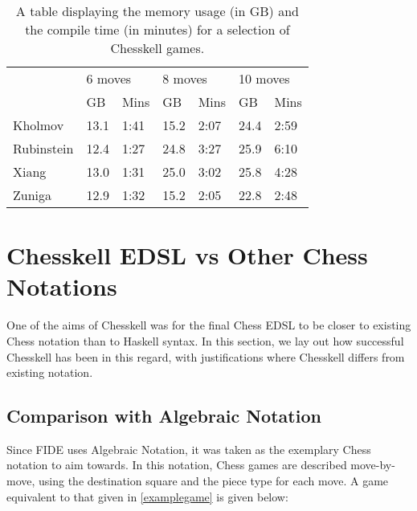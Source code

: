\begin{table}[h]
    \centering
    \begin{tabular}{l|ll|ll|ll}
                   & \multicolumn{2}{|l|}{6 moves} & \multicolumn{2}{|l|}{8 moves} & \multicolumn{2}{|l}{10 moves}                      \\
                   & GB                            & Mins                          & GB                            & Mins & GB   & Mins \\
        \hline
        Kholmov    & 13.1                          & 1:41                          & 15.2                          & 2:07 & 24.4 & 2:59 \\
        Rubinstein & 12.4                          & 1:27                          & 24.8                          & 3:27 & 25.9 & 6:10 \\
        Xiang      & 13.0                          & 1:31                          & 25.0                          & 3:02 & 25.8 & 4:28 \\
        Zuniga     & 12.9                          & 1:32                          & 15.2                          & 2:05 & 22.8 & 2:48
    \end{tabular}
    \caption{A table displaying the memory usage (in GB) and the compile time (in minutes) for a selection of Chesskell games.}
    \label{performancetable}
\end{table}

\section{Chesskell EDSL vs Other Chess Notations}

One of the aims of Chesskell was for the final Chess EDSL to be closer to existing Chess notation than to Haskell syntax. In this section, we lay out how successful Chesskell has been in this regard, with justifications where Chesskell differs from existing notation.

\subsection{Comparison with Algebraic Notation}

Since FIDE uses Algebraic Notation, it was taken as the exemplary Chess notation to aim towards. In this notation, Chess games are described move-by-move, using the destination square and the piece type for each move. A game equivalent to that given in \cref{examplegame} is given below:

